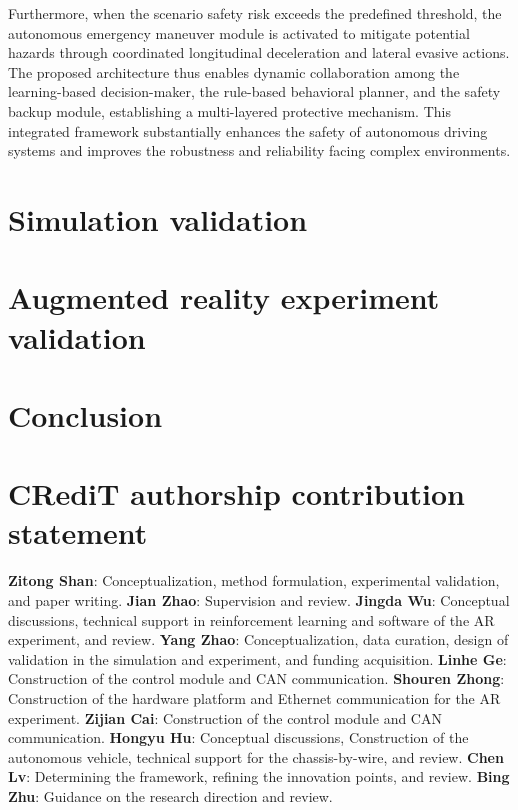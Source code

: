 \documentclass[preprint,12pt,authoryear]{elsarticle}
\begin{document}
Furthermore, when the scenario safety risk exceeds the predefined threshold, the autonomous emergency maneuver module is activated to mitigate potential hazards through coordinated longitudinal deceleration and lateral evasive actions. The proposed architecture thus enables dynamic collaboration among the learning-based decision-maker, the rule-based behavioral planner, and the safety backup module, establishing a multi-layered protective mechanism. 
This integrated framework  substantially enhances the safety of autonomous driving systems and improves the robustness and reliability facing complex environments.

\section{Simulation validation}
\label{sec4}

\section{Augmented reality experiment validation}
\label{sec5}

\section{Conclusion}
\label{sec6}

\section*{CRediT authorship contribution statement}

\textbf{Zitong Shan}: Conceptualization, method formulation, experimental validation, and paper writing.
\textbf{Jian Zhao}: Supervision and review.
\textbf{Jingda Wu}: Conceptual discussions, technical support in reinforcement learning and software of the AR experiment, and review.
\textbf{Yang Zhao}: Conceptualization, data curation, design of validation in the simulation and experiment, and funding acquisition.
\textbf{Linhe Ge}: Construction of the control module and CAN communication.
\textbf{Shouren Zhong}: Construction of the hardware platform and Ethernet communication for the AR experiment.
\textbf{Zijian Cai}: Construction of the control module and CAN communication.
\textbf{Hongyu Hu}: Conceptual discussions, Construction of the autonomous vehicle, technical support for the chassis-by-wire, and review.
\textbf{Chen Lv}: Determining the framework, refining the innovation points, and review.
\textbf{Bing Zhu}: Guidance on the research direction and review.
\end{document}
